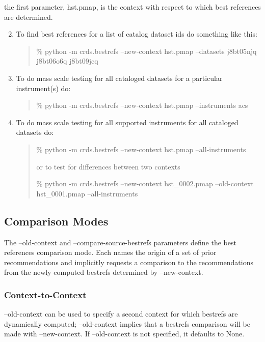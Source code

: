\documentclass[letterpaper,10pt,english]{sphinxmanual}
\begin{document}
the first parameter, hst.pmap,  is the context with respect to which best references are determined.
\begin{enumerate}
\setcounter{enumi}{1}
\item {} 
To find best references for a list of catalog dataset ids do something like this:
\begin{quote}

\% python -m crds.bestrefs --new-context hst.pmap --datasets j8bt05njq j8bt06o6q j8bt09jcq
\end{quote}

\item {} 
To do mass scale testing for all cataloged datasets for a particular instrument(s) do:
\begin{quote}

\% python -m crds.bestrefs --new-context hst.pmap --instruments acs
\end{quote}

\item {} 
To do mass scale testing for all supported instruments for all cataloged datasets do:
\begin{quote}

\% python -m crds.bestrefs --new-context hst.pmap --all-instruments

or to test for differences between two contexts

\% python -m crds.bestrefs --new-context hst\_0002.pmap --old-context hst\_0001.pmap --all-instruments
\end{quote}

\end{enumerate}


\subsection{Comparison Modes}
\label{command_line_tools:comparison-modes}
The --old-context and --compare-source-bestrefs parameters define the best references comparison mode.  Each names
the origin of a set of prior recommendations and implicitly requests a comparison to the recommendations from
the newly computed bestrefs determined by --new-context.


\subsubsection{Context-to-Context}
\label{command_line_tools:context-to-context}
--old-context can be used to specify a second context for which bestrefs are dynamically computed; --old-context
implies that a bestrefs comparison will be made with --new-context.   If --old-context is not specified,  it
defaults to None.
\end{document}
